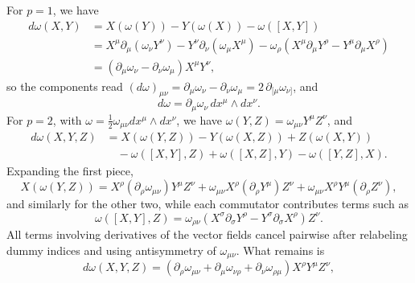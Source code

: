 \begin{solution}
    For $p=1$, we have
    \begin{equation}
        \begin{aligned}
            d\omega(X,Y) &= X(\omega(Y)) - Y(\omega(X)) - \omega([X,Y])\\
            &= X^\mu\partial_\mu(\omega_\nu Y^\nu) - Y^\nu\partial_\nu(\omega_\mu X^\mu) - \omega_\rho(X^\mu\partial_\mu Y^\rho - Y^\mu\partial_\mu X^\rho)\\
            &= (\partial_\mu\omega_\nu - \partial_\nu\omega_\mu)X^\mu Y^\nu,
        \end{aligned}
    \end{equation}
    so the components read $(d\omega)_{\mu\nu} = \partial_\mu\omega_\nu - \partial_\nu\omega_\mu = 2\,\partial_{[\mu}\omega_{\nu]}$, and
    \begin{equation}
        d\omega = \partial_\mu\omega_\nu\,dx^\mu\wedge dx^\nu.
    \end{equation}
    For $p=2$, with $\omega = \frac{1}{2}\omega_{\mu\nu}dx^\mu\wedge dx^\nu$, we have $\omega(Y,Z) = \omega_{\mu\nu}Y^\mu Z^\nu$, and
    \begin{equation}
        \begin{aligned}
            d\omega(X,Y,Z) &= X(\omega(Y,Z)) - Y(\omega(X,Z)) + Z(\omega(X,Y))\\
            &\quad - \omega([X,Y],Z) + \omega([X,Z],Y) - \omega([Y,Z],X).
        \end{aligned}
    \end{equation}
    Expanding the first piece,
    \begin{equation}
        X(\omega(Y,Z)) = X^\rho(\partial_\rho\omega_{\mu\nu})Y^\mu Z^\nu + \omega_{\mu\nu}X^\rho(\partial_\rho Y^\mu)Z^\nu + \omega_{\mu\nu}X^\rho Y^\mu(\partial_\rho Z^\nu),
    \end{equation}
    and similarly for the other two, while each commutator contributes terms such as
    \begin{equation}
        \omega([X,Y],Z) = \omega_{\rho\nu}(X^\sigma\partial_\sigma Y^\rho - Y^\sigma\partial_\sigma X^\rho)Z^\nu.
    \end{equation}
    All terms involving derivatives of the vector fields cancel pairwise after relabeling dummy indices and using antisymmetry of $\omega_{\mu\nu}$. What remains is
    \begin{equation}
        d\omega(X,Y,Z) = \left(\partial_\rho\omega_{\mu\nu} + \partial_\mu\omega_{\nu\rho} + \partial_\nu\omega_{\rho\mu}\right)X^\rho Y^\mu Z^\nu,

\end{equation}
\end{solution}
